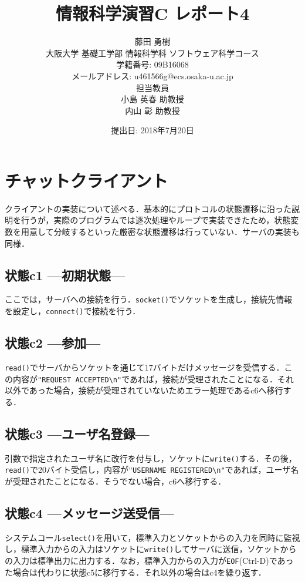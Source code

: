 \documentclass[a4j,10pt,titlepage]{jsarticle}
\title{情報科学演習C レポート4}
\author{藤田 勇樹 \\
大阪大学 基礎工学部 情報科学科 ソフトウェア科学コース\\
学籍番号: 09B16068 \\
メールアドレス: u461566g@ecs.osaka-u.ac.jp \\
担当教員\\
小島 英春 助教授 \\
内山 彰 助教授}
\date{提出日: 2018年7月20日}
\begin{document}
\maketitle
\section{チャットクライアント}
クライアントの実装について述べる．基本的にプロトコルの状態遷移に沿った説明を行うが，実際のプログラムでは逐次処理やループで実装できたため，状態変数を用意して分岐するといった厳密な状態遷移は行っていない．サーバの実装も同様．

\subsection{状態c1 ---初期状態---}
ここでは，サーバへの接続を行う．\verb|socket()|でソケットを生成し，接続先情報を設定し，\verb|connect()|で接続を行う．

\subsection{状態c2 ---参加---}
\verb|read()|でサーバからソケットを通じて17バイトだけメッセージを受信する\footnotemark．この内容が\verb|"REQUEST ACCEPTED\n"|であれば，接続が受理されたことになる．それ以外であった場合，接続が受理されていないためエラー処理であるc6へ移行する．


\subsection{状態c3 ---ユーザ名登録---}
引数で指定されたユーザ名に改行を付与し，ソケットに\verb|write()|する．その後，\verb|read()|で20バイト受信し，内容が\verb|"USERNAME REGISTERED\n"|であれば，ユーザ名が受理されたことになる．そうでない場合，c6へ移行する．

\subsection{状態c4 ---メッセージ送受信---}
システムコール\verb|select()|を用いて，標準入力とソケットからの入力を同時に監視し，標準入力からの入力はソケットに\verb|write()|してサーバに送信，ソケットからの入力は標準出力に出力する．なお，標準入力からの入力が\verb|EOF|(Ctrl-D)であった場合は代わりに状態c5に移行する．それ以外の場合はc4を繰り返す．
\end{document}

